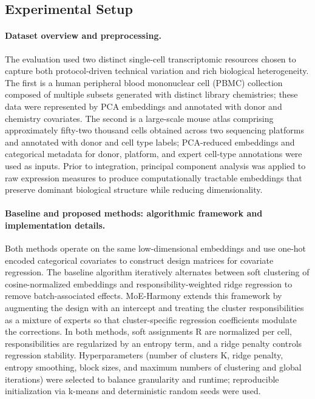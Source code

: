 \documentclass{article}
\begin{document}
\subsection{Experimental Setup}

\paragraph{Dataset overview and preprocessing.} The evaluation used two distinct single-cell transcriptomic resources chosen to capture both protocol-driven technical variation and rich biological heterogeneity. The first is a human peripheral blood mononuclear cell (PBMC) collection composed of multiple subsets generated with distinct library chemistries; these data were represented by PCA embeddings and annotated with donor and chemistry covariates. The second is a large-scale mouse atlas comprising approximately fifty-two thousand cells obtained across two sequencing platforms and annotated with donor and cell type labels; PCA-reduced embeddings and categorical metadata for donor, platform, and expert cell\hyp{}type annotations were used as inputs. Prior to integration, principal component analysis was applied to raw expression measures to produce computationally tractable embeddings that preserve dominant biological structure while reducing dimensionality.

\paragraph{Baseline and proposed methods: algorithmic framework and implementation details.} Both methods operate on the same low-dimensional embeddings and use one\hyp{}hot encoded categorical covariates to construct design matrices for covariate regression. The baseline algorithm iteratively alternates between soft clustering of cosine-normalized embeddings and responsibility-weighted ridge regression to remove batch-associated effects. MoE-Harmony extends this framework by augmenting the design with an intercept and treating the cluster responsibilities as a mixture of experts so that cluster-specific regression coefficients modulate the corrections. In both methods, soft assignments R are normalized per cell, responsibilities are regularized by an entropy term, and a ridge penalty controls regression stability. Hyperparameters (number of clusters K, ridge penalty, entropy smoothing, block sizes, and maximum numbers of clustering and global iterations) were selected to balance granularity and runtime; reproducible initialization via k-means and deterministic random seeds were used.
\end{document}
